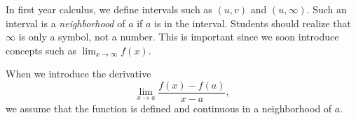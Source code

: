 \documentclass{sample}
\begin{document}
 
In first year calculus, we   define intervals  such 
as $(u, v)$ and $(u, \infty)$.  Such an interval 
is a \emph{neighborhood} of  $a$
if  $a$ is in the interval.  Students should 
realize that  $\infty$ is only a
symbol, not a number.  This is important since 
we soon introduce concepts
 such as $\lim_{x \to \infty} f(x)$.  

When we introduce the derivative
\[
   \lim_{x \to a} \frac{f(x) - f(a)}{x - a},
\]
we assume that the function is defined and continuous 
in a neighborhood of  $a$.
\end{document}
